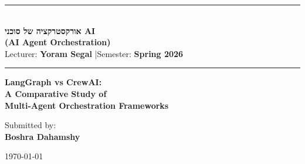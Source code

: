 \documentclass[12pt,a4paper]{article}
\begin{document}
\begin{titlepage}
    \begin{center}
        \vspace*{1.5cm}

        \rule{\textwidth}{1.5pt}\\[0.6em]
        {\large\bfseries
            \texthebrew{אורקסטרקציה של סוכני AI}\\[0.3em]
            {\normalfont\normalsize (AI Agent Orchestration)}
        }\\[0.4em]
        {\normalsize Lecturer: \textbf{Yoram Segal} \quad|\quad Semester: \textbf{Spring 2026}}\\[0.2em]
        \rule{\textwidth}{1.5pt}

        \vspace{3cm}

        {\LARGE\bfseries
            LangGraph vs CrewAI:\\[0.4em]
            A Comparative Study of\\[0.4em]
            Multi-Agent Orchestration Frameworks
        }

        \vspace{3cm}

        {\large Submitted by:}\\[0.5em]
        {\Large\bfseries Boshra Dahamshy}

        \vfill

        {\normalsize \today}
    \end{center}
\end{titlepage}

\thispagestyle{empty}
\tableofcontents
\newpage
\setcounter{page}{1}

\begin{abstract}
\noindent
This study presents a comprehensive comparison of two prominent multi-agent
orchestration frameworks: LangGraph and CrewAI\@. Each framework is analysed
based on architecture, design philosophy, and operational efficiency. Emphasising
a structured comparison, the paper explores the frameworks' scalability, state
management strategies, and tool support. The discussion interprets quantitative
and qualitative aspects, offering critical insights into their respective
applications and limitations. Ultimately, recommendations are made regarding
the appropriate contexts for each framework's use, aiding developers in
software architecture decision-making.
\end{abstract}
\end{document}
